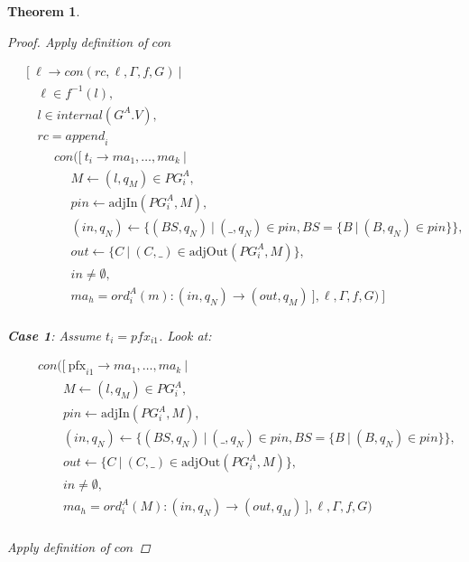 \documentclass[twocolumn, openany]{sig-alternate-10pt}
\newcommand{\Pfx}{\mathrm{pfx}}%
\newtheorem{thm}{Theorem}
\begin{document}
\begin{thm}
\begin{proof}
  Apply definition of $con$

  \[ \begin{array}{l}
     ~~~~~ [~ \ell \rightarrow con(rc,\ell,\Gamma,f,G) ~\vert~ \\
     ~~~~~~~~~ \ell \in f^{-1}(l), \\
     ~~~~~~~~~ l \in internal(G^A.V), \\
     ~~~~~~~~~ rc = \mathit{append}_i~  \\
     ~~~~~~~~~~~~~~~ con([~ t_i \rightarrow ma_1, \dots, ma_k ~\vert~ \\
     ~~~~~~~~~~~~~~~~~~~~~ M \leftarrow (l,q_M) \in PG^A_i, \\
     ~~~~~~~~~~~~~~~~~~~~~ pin \leftarrow \text{adjIn}(PG^A_i,M), \\
     ~~~~~~~~~~~~~~~~~~~~~ (in,q_N) \leftarrow \{ (BS,q_N) ~\vert~ (\_,q_N) \in pin, BS=\{B ~\vert~ (B,q_N) \in pin \} \}, \\
     ~~~~~~~~~~~~~~~~~~~~~ out \leftarrow \{ C ~\vert~ (C,\_) \in \text{adjOut}(PG^A_i,M) \}, \\
     ~~~~~~~~~~~~~~~~~~~~~ in \neq \emptyset, \\
     ~~~~~~~~~~~~~~~~~~~~~ ma_h = ord^A_i(m) : (in,q_N) \rightarrow (out,q_M) ~],\ell,\Gamma,f,G) ~] \\
  \end{array} \]%

  \vspace{1em}
  \textbf{Case 1}: Assume $t_i = pfx_{i1}$. Look at:

  \[ \begin{array}{l}
     ~~~~~~~~~ con([~ \Pfx_{i1} \rightarrow ma_1, \dots, ma_k ~\vert~ \\
     ~~~~~~~~~~~~~~~~~~ M \leftarrow (l,q_M) \in PG^A_i, \\
     ~~~~~~~~~~~~~~~~~~ pin \leftarrow \text{adjIn}(PG^A_i,M), \\
     ~~~~~~~~~~~~~~~~~~ (in,q_N) \leftarrow \{ (BS,q_N) ~\vert~ (\_,q_N) \in pin, BS=\{B ~\vert~ (B,q_N) \in pin \} \}, \\
     ~~~~~~~~~~~~~~~~~~ out \leftarrow \{ C ~\vert~ (C,\_) \in \text{adjOut}(PG^A_i,M) \}, \\
     ~~~~~~~~~~~~~~~~~~ in \neq \emptyset, \\
     ~~~~~~~~~~~~~~~~~~ ma_h = ord^A_i(M) : (in,q_N) \rightarrow (out,q_M) ~],\ell,\Gamma,f,G) \\
  \end{array} \]%

  Apply definition of $con$


\end{proof}
\end{thm}
\end{document}
